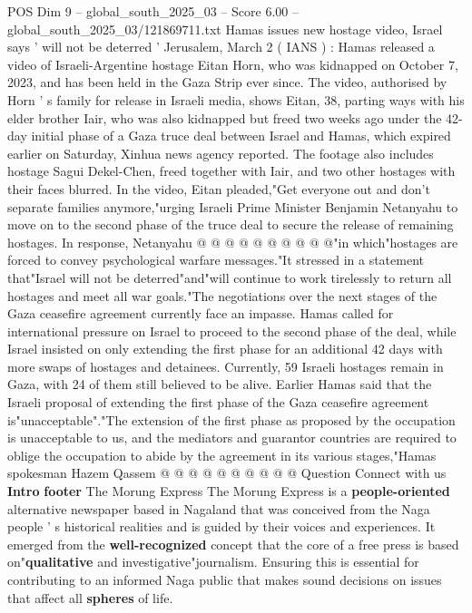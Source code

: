 \begin{textsample}{POS Dim 9 – global\_south\_2025\_03 – Score 6.00 – global\_south\_2025\_03/121869711.txt}  \label{ex:f9_pos_133}
Hamas issues new hostage video, Israel says ' will not be deterred ' Jerusalem, March 2 ( IANS ) : Hamas released a video of Israeli-Argentine hostage Eitan Horn, who was kidnapped on October 7, 2023, and has been held in the Gaza Strip ever since.
The video, authorised by Horn ' s family for release in Israeli media, shows Eitan, 38, parting ways with his elder brother Iair, who was also kidnapped but freed two weeks ago under the 42-day initial phase of a Gaza truce deal between Israel and Hamas, which expired earlier on Saturday, Xinhua news agency reported.
The footage also includes hostage Sagui Dekel-Chen, freed together with Iair, and two other hostages with their faces blurred.
In the video, Eitan pleaded,"Get everyone out and don't separate families anymore,"urging Israeli Prime Minister Benjamin Netanyahu to move on to the second phase of the truce deal to secure the release of remaining hostages.
In response, Netanyahu @ @ @ @ @ @ @ @ @ @"in which"hostages are forced to convey psychological warfare messages."It stressed in a statement that"Israel will not be deterred"and"will continue to work tirelessly to return all hostages and meet all war goals."The negotiations over the next stages of the Gaza ceasefire agreement currently face an impasse.
Hamas called for international pressure on Israel to proceed to the second phase of the deal, while Israel insisted on only extending the first phase for an additional 42 days with more swaps of hostages and detainees.
Currently, 59 Israeli hostages remain in Gaza, with 24 of them still believed to be alive.
Earlier Hamas said that the Israeli proposal of extending the first phase of the Gaza ceasefire agreement is"unacceptable"."The extension of the first phase as proposed by the occupation is unacceptable to us, and the mediators and guarantor countries are required to oblige the occupation to abide by the agreement in its various stages,"Hamas spokesman Hazem Qassem @ @ @ @ @ @ @ @ @ @ Question Connect with us \textbf{Intro} \textbf{footer} The Morung Express The Morung Express is a \textbf{people-oriented} alternative newspaper based in Nagaland that was conceived from the Naga people ' s historical realities and is guided by their voices and experiences.
It emerged from the \textbf{well-recognized} concept that the core of a free press is based on"\textbf{qualitative} and investigative"journalism.
Ensuring this is essential for contributing to an informed Naga public that makes sound decisions on issues that affect all \textbf{spheres} of life.

\end{textsample}
